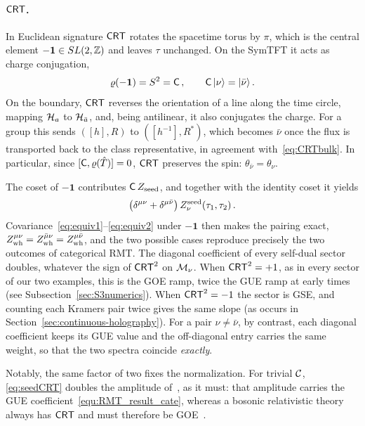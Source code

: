 \documentclass[11pt]{article}
\numberwithin{equation}{section}
\newcommand{\Zwh}{Z_{\rm wh}}
\newcommand{\vr}{\varrho}
\begin{document}
\paragraph{$\mathsf{CRT}$.} In Euclidean signature $\mathsf{CRT}$ rotates the spacetime torus by $\pi$, which is the central element $-\mathbf 1\in SL(2,\mathbb Z)$ and leaves $\tau$ unchanged. On the SymTFT it acts as charge conjugation,
\begin{equation}\label{eq:CRTbulk}
\vr(-\mathbf 1)=S^2=\Cc\,,\qquad \Cc\,|\nu\rangle=|\bar\nu\rangle\,.
\end{equation}
On the boundary, $\mathsf{CRT}$ reverses the orientation of a line along the time circle, mapping $\mathcal{H}_a$ to $\mathcal{H}_{\bar a}$, and, being antilinear, it also conjugates the charge. For a group this sends $([h],R)$ to $([h^{-1}],R^*)$, which becomes $\bar\nu$ once the flux is transported back to the class representative, in agreement with~\eqref{eq:CRTbulk}. In particular, since  $[\Cc,\vr(\hat{T})]=0$,  $\mathsf{CRT}$ preserves the spin: $\theta_{\bar\nu}=\theta_\nu$.

The coset of $-\mathbf 1$ contributes $\mathsf{C}\,Z_{\rm seed}$, and together with the identity coset it yields
\begin{equation}\label{eq:seedCRT}
\big(\delta^{\mu\nu}+\delta^{\mu\bar\nu}\big)\,Z^{\rm seed}_\nu(\tau_1,\tau_2)\,.
\end{equation}
Covariance~\eqref{eq:equiv1}--\eqref{eq:equiv2} under $-\mathbf 1$ then makes the pairing exact, $\Zwh^{\mu\nu}=\Zwh^{\bar\mu\nu}=\Zwh^{\mu\bar\nu}$, and the two possible cases reproduce precisely the two outcomes of categorical RMT. The diagonal coefficient of every self-dual sector doubles, whatever the sign of $\mathsf{CRT}^2$ on $\mathcal{M}_\nu$. When $\mathsf{CRT}^2=+1$, as in every sector of our two examples, this is the GOE ramp, twice the GUE ramp at early times (see Subsection~\ref{sec:S3numerics}). When $\mathsf{CRT}^2=-1$ the sector is GSE, and counting each Kramers pair twice gives the same slope (as occurs in Section~\ref{sec:continuous-holography}). For a pair $\nu\neq\bar\nu$, by contrast, each diagonal coefficient keeps its GUE value and the off-diagonal entry carries the same weight, so that the two spectra coincide \emph{exactly}.

Notably, the same factor of two fixes the normalization. For trivial $\mathcal C$, \eqref{eq:seedCRT} doubles the amplitude of~\cite{Cotler:2020ugk}, as it must: that amplitude carries the GUE coefficient~\eqref{equ:RMT_result_cate}, whereas a bosonic relativistic theory always has $\mathsf{CRT}$ and must therefore be GOE~\cite{Yan:2023rjh,DiUbaldo:2023qli}.
\end{document}
